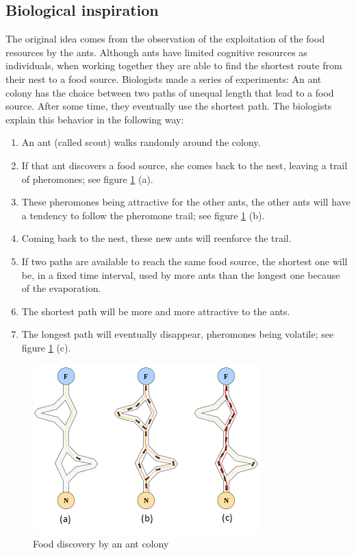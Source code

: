 \subsection{Biological inspiration}\label{bio}
The original idea comes from the observation of the exploitation of the food resources by the ants. Although ants have limited cognitive resources as individuals, when working together they are able to find the shortest route from their nest to a food source.
Biologists made a series of experiments: An ant colony has the choice between two paths of unequal length that lead to a food source. After some time, they eventually use the shortest path.
The biologists explain this behavior in the following way:
\begin{enumerate}
	\item An ant (called scout) walks randomly around the colony.
	\item If that ant discovers a food source, she comes back to the nest, leaving a trail of pheromones; see figure \ref{choice} (a).
	\item These pheromones being attractive for the other ants, the other ants will have a tendency to follow the pheromone trail; see figure \ref{choice} (b).
	\item Coming back to the nest, these new ants will reenforce the trail.
	\item If two paths are available to reach the same food source, the shortest one will be, in a fixed time interval, used by more ants than the longest one because of the evaporation.
	\item The shortest path will be more and more attractive to the ants.
	\item The longest path will eventually disappear, pheromones being volatile; see figure \ref{choice} (c). 
\end{enumerate}
 
\begin{figure}
	\centering
		\includegraphics{images/330px-Aco_branches.png}
	\caption{Food discovery by an ant colony}
	\label{choice}
\end{figure}

